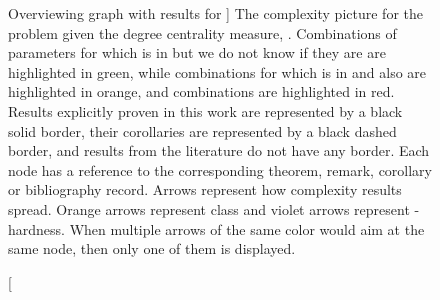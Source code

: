 \begin{figure}[t]
    \caption
    [Overviewing graph with results for \HLdeg]
    {
        The complexity picture for the \HL problem given the degree centrality measure, \HLdeg.
        Combinations of parameters for which \HLdeg is in \XP but we do not know if they are \Wh are highlighted in green,
        while combinations for which \HLdeg is in \XP and also \Wh are highlighted in orange,
        and \pNPh combinations are highlighted in red.
        Results explicitly proven in this work are represented by a black solid border,
        their corollaries are represented by a black dashed border, and
        results from the literature do not have any border.
        Each node has a reference to the corresponding theorem, remark, corollary or bibliography record.
        Arrows represent how complexity results spread.
        Orange arrows represent \XP class and violet arrows represent \Wone-hardness.
        When multiple arrows of the same color would aim at the same node,
        then only one of them is displayed.  
    }
    \label{fig:complexityPicture}
\end{figure}
